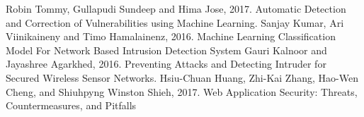 \documentclass[a4paper, 12pt, conference]{article}
\begin{document}
\begin{thebibliography}{99}

 Robin Tommy, Gullapudi Sundeep and Hima Jose, 2017. Automatic Detection and Correction of Vulnerabilities using Machine Learning.
 Sanjay Kumar, Ari Viinikaineny and Timo Hamalainenz, 2016. Machine Learning Classification Model For Network Based Intrusion Detection System
 Gauri Kalnoor and Jayashree Agarkhed, 2016. Preventing Attacks and Detecting Intruder for Secured Wireless Sensor Networks.
 Hsiu-Chuan Huang, Zhi-Kai Zhang, Hao-Wen Cheng, and Shiuhpyng Winston Shieh, 2017. Web Application Security: Threats, Countermeasures, and Pitfalls


\end{thebibliography}
\end{document}
